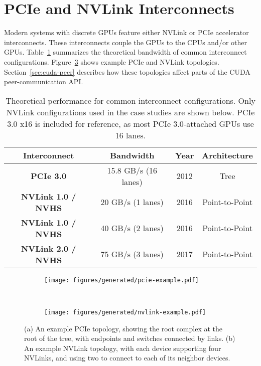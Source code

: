 \section{PCIe and NVLink Interconnects}
\label{sec:interconnects}

Modern systems with discrete GPUs feature either NVLink or PCIe accelerator interconnects.
These interconnects couple the GPUs to the CPUs and/or other GPUs.
Table~\ref{tab:interconnect-overview} summarizes the theoretical bandwidth of common interconnect configurations.
Figure~\ref{fig:interconnect-cartoon} shows example PCIe and NVLink topologies.
Section~\ref{sec:cuda-peer} describes how these topologies affect parts of the CUDA peer-communication API.

\begin{table}[ht]
	\centering
	\caption[Interconnect performance summary]{
		Theoretical performance for common interconnect configurations.
		Only NVLink configurations used in the case studies are shown below.
		PCIe 3.0 x16 is included for reference, as most PCIe 3.0-attached GPUs use 16 lanes.
	}
	\label{tab:interconnect-overview}
	\begin{tabular}{cccc}
		\hline
		\textbf{Interconnect}      & \textbf{Bandwidth}   & \textbf{Year} & \textbf{Architecture} \\ \hline
		\textbf{PCIe 3.0}          & 15.8 GB/s (16 lanes) & 2012          & Tree                  \\ \hline
		\textbf{NVLink 1.0 / NVHS} &   20 GB/s (1 lanes)  & 2016          & Point-to-Point        \\ \hline
		\textbf{NVLink 1.0 / NVHS} &   40 GB/s (2 lanes)  & 2016          & Point-to-Point        \\ \hline
		\textbf{NVLink 2.0 / NVHS} &   75 GB/s (3 lanes)  & 2017          & Point-to-Point        \\ \hline
	\end{tabular}
\end{table}

\begin{figure}[ht]
    \centering
	\begin{subfigure}[b]{0.4\textwidth}
		\texttt{[image: figures/generated/pcie-example.pdf]}
		\caption[]{}
		\label{fig:pcie-cartoon}
    \end{subfigure}
    ~
    \begin{subfigure}[b]{0.4\textwidth}
		\texttt{[image: figures/generated/nvlink-example.pdf]}
		\caption[]{}
		\label{fig:nvlink-cartoon}
    \end{subfigure}
    \caption[Example PCIe and NVLink interconnect topologies]{
		(a) An example PCIe topology, showing the root complex at the root of the tree, with endpoints and switches connected by links.
		(b) An example NVLink topology, with each device supporting four NVLinks, and using two to connect to each of its neighbor devices.
	}
    \label{fig:interconnect-cartoon}
\end{figure}

